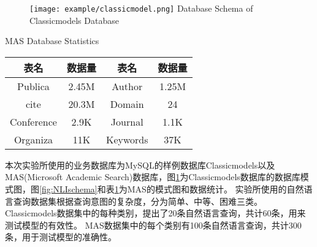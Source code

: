 \begin{figure}[!htp]
    \centering
    \texttt{[image: example/classicmodel.png]}
      {Database Schema of Classicmodels Database}
    \label{fig:NLIclassicmodel}
  \end{figure}

  \begin{table}[!hpb]
    \centering
      {MAS Database Statistics}
    \label{nli:MASsjksjtj}
    \begin{tabular}{|c|c|c|c|} 
      \hline
      表名 & 数据量 & 表名 & 数据量\\
      \hline
      Publica & 2.45M & Author & 1.25M\\
      \hline
      cite & 20.3M & Domain & 24\\
      \hline
      Conference & 2.9K & Journal & 1.1K\\
      \hline
      Organiza & 11K & Keywords & 37K\\
      \hline
    \end{tabular}
  \end{table}


本次实验所使用的业务数据库为MySQL的样例数据库Classicmodels以及MAS(Microsoft Academic Search)数据库，图\ref{fig:NLIclassicmodel}为Classicmodels数据库的数据库模式图，图\ref{fig:NLIschema}和表\ref{nli:MASsjksjtj}为MAS的模式图和数据统计。
实验所使用的自然语言查询数据集根据查询意图的复杂度，分为简单、中等、困难三类。
Classicmodels数据集中的每种类别，提出了20条自然语言查询，共计60条，用来测试模型的有效性。
MAS数据集中的每个类别有100条自然语言查询，共计300条，用于测试模型的准确性。

